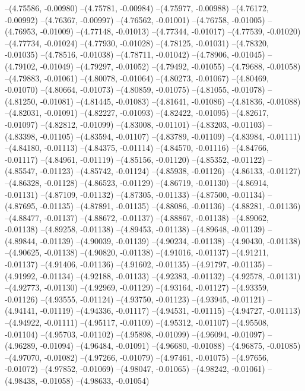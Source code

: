 --(4.75586, -0.00980)
--(4.75781, -0.00984)
--(4.75977, -0.00988)
--(4.76172, -0.00992)
--(4.76367, -0.00997)
--(4.76562, -0.01001)
--(4.76758, -0.01005)
--(4.76953, -0.01009)
--(4.77148, -0.01013)
--(4.77344, -0.01017)
--(4.77539, -0.01020)
--(4.77734, -0.01024)
--(4.77930, -0.01028)
--(4.78125, -0.01031)
--(4.78320, -0.01035)
--(4.78516, -0.01038)
--(4.78711, -0.01042)
--(4.78906, -0.01045)
--(4.79102, -0.01049)
--(4.79297, -0.01052)
--(4.79492, -0.01055)
--(4.79688, -0.01058)
--(4.79883, -0.01061)
--(4.80078, -0.01064)
--(4.80273, -0.01067)
--(4.80469, -0.01070)
--(4.80664, -0.01073)
--(4.80859, -0.01075)
--(4.81055, -0.01078)
--(4.81250, -0.01081)
--(4.81445, -0.01083)
--(4.81641, -0.01086)
--(4.81836, -0.01088)
--(4.82031, -0.01091)
--(4.82227, -0.01093)
--(4.82422, -0.01095)
--(4.82617, -0.01097)
--(4.82812, -0.01099)
--(4.83008, -0.01101)
--(4.83203, -0.01103)
--(4.83398, -0.01105)
--(4.83594, -0.01107)
--(4.83789, -0.01109)
--(4.83984, -0.01111)
--(4.84180, -0.01113)
--(4.84375, -0.01114)
--(4.84570, -0.01116)
--(4.84766, -0.01117)
--(4.84961, -0.01119)
--(4.85156, -0.01120)
--(4.85352, -0.01122)
--(4.85547, -0.01123)
--(4.85742, -0.01124)
--(4.85938, -0.01126)
--(4.86133, -0.01127)
--(4.86328, -0.01128)
--(4.86523, -0.01129)
--(4.86719, -0.01130)
--(4.86914, -0.01131)
--(4.87109, -0.01132)
--(4.87305, -0.01133)
--(4.87500, -0.01134)
--(4.87695, -0.01135)
--(4.87891, -0.01135)
--(4.88086, -0.01136)
--(4.88281, -0.01136)
--(4.88477, -0.01137)
--(4.88672, -0.01137)
--(4.88867, -0.01138)
--(4.89062, -0.01138)
--(4.89258, -0.01138)
--(4.89453, -0.01138)
--(4.89648, -0.01139)
--(4.89844, -0.01139)
--(4.90039, -0.01139)
--(4.90234, -0.01138)
--(4.90430, -0.01138)
--(4.90625, -0.01138)
--(4.90820, -0.01138)
--(4.91016, -0.01137)
--(4.91211, -0.01137)
--(4.91406, -0.01136)
--(4.91602, -0.01135)
--(4.91797, -0.01135)
--(4.91992, -0.01134)
--(4.92188, -0.01133)
--(4.92383, -0.01132)
--(4.92578, -0.01131)
--(4.92773, -0.01130)
--(4.92969, -0.01129)
--(4.93164, -0.01127)
--(4.93359, -0.01126)
--(4.93555, -0.01124)
--(4.93750, -0.01123)
--(4.93945, -0.01121)
--(4.94141, -0.01119)
--(4.94336, -0.01117)
--(4.94531, -0.01115)
--(4.94727, -0.01113)
--(4.94922, -0.01111)
--(4.95117, -0.01109)
--(4.95312, -0.01107)
--(4.95508, -0.01104)
--(4.95703, -0.01102)
--(4.95898, -0.01099)
--(4.96094, -0.01097)
--(4.96289, -0.01094)
--(4.96484, -0.01091)
--(4.96680, -0.01088)
--(4.96875, -0.01085)
--(4.97070, -0.01082)
--(4.97266, -0.01079)
--(4.97461, -0.01075)
--(4.97656, -0.01072)
--(4.97852, -0.01069)
--(4.98047, -0.01065)
--(4.98242, -0.01061)
--(4.98438, -0.01058)
--(4.98633, -0.01054)
